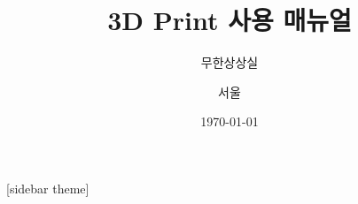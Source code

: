 \documentclass[11pt]{beamer}
\title[]{3D Print 사용 매뉴얼}
\subtitle[]{무한상상실}
\author[]{서울}
\institute[GSHS]{경기과학고등학교}
\date[]{\today}
\begin{document}
\begin{frame}[plain]
\titlepage
\end{frame}
[sidebar theme]

\end{document}
